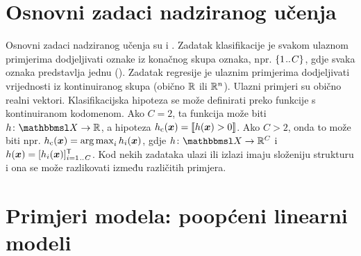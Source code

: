 \documentclass[utf8, diplomski, lmodern]{fer}
\begin{document}
\section{Osnovni zadaci nadziranog učenja}

Osnovni zadaci nadziranog učenja su  i . Zadatak klasifikacije je svakom ulaznom primjerima dodjeljivati oznake iz konačnog skupa oznaka, npr. $\cbr{1\bidot C}$, gdje svaka oznaka predstavlja jednu  (). Zadatak regresije je ulaznim primjerima dodjeljivati vrijednosti iz kontinuiranog skupa (obično $\mathbb{R}$ ili $\mathbb{R}^n$). Ulazni primjeri su obično realni vektori. Klasifikacijska hipoteza se može definirati preko funkcije s kontinuiranom kodomenom. Ako $C=2$, ta funkcija može biti $\funcdef{h}{\set X}{\R}$, a hipoteza $h_\text{c}(\vec x)=\enbbracket{h(\vec x)>0}$. Ako $C>2$, onda to može biti npr. $h_\text{c}(\vec x)=\argmax_i h_i(\vec x)$, gdje $\funcdef{h}{\set X}{\R^C}$ i $h(\vec x)=\sbr{h_i(\vec x)}_{i=1\bidot C}^\tp$. Kod nekih zadataka ulazi ili izlazi imaju složeniju strukturu i ona se može razlikovati između različitih primjera.

\iffalse
\subsection{Primjeri evaluacijskih mjera}


\subsubsection{Klasifikacija}

\fi

\section{Primjeri modela: poopćeni linearni modeli} \label{sec:poopceni-linearni-modeli}
\end{document}
